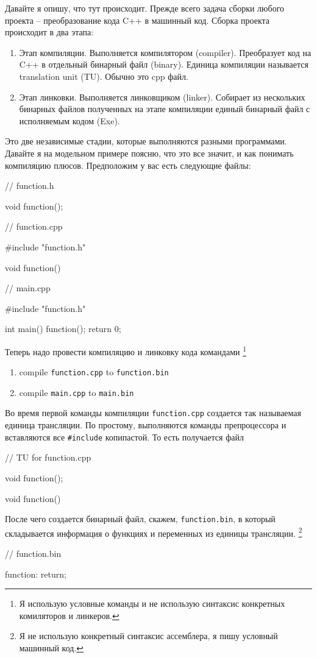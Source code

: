 Давайте я опишу, что тут происходит.
Прежде всего задача сборки любого проекта -- преобразование кода C++ в машинный код.
Сборка проекта происходит в два этапа:
\begin{enumerate}
\item Этап компиляции.
Выполняется компилятором (compiler).
Преобразует код на C++ в отдельный бинарный файл (binary).
Единица компиляции называется translation unit (TU).
Обычно это cpp файл.

\item Этап линковки.
Выполняется линковщиком (linker).
Собирает из нескольких бинарных файлов полученных на этапе компиляции единый бинарный файл с исполняемым кодом (Exe).
\end{enumerate}

Это две независимые стадии, которые выполняются разными программами.
Давайте я на модельном примере поясню, что это все значит, и как понимать компиляцию плюсов.
Предположим у вас есть следующие файлы:
\begin{cppcode}
// function.h

void function();

// function.cpp

#include "function.h"

void function() {
}

// main.cpp

#include "function.h"

int main() {
function();
return 0;
}
\end{cppcode}
Теперь надо провести компиляцию и линковку кода командами%
\footnote{Я использую условные команды и не использую синтаксис конкретных комиляторов и линкеров.}
\begin{enumerate}
\item compile \verb"function.cpp" to \verb"function.bin"

\item compile \verb"main.cpp" to \verb"main.bin"
\end{enumerate}
Во время первой команды компиляции \verb"function.cpp" создается так называемая единица трансляции.
По простому, выполняются команды препроцессора и вставляются все \verb"#include" копипастой.
То есть получается файл
\begin{cppcode}
// TU for function.cpp

void function();

void function() {
}
\end{cppcode}
После чего создается бинарный файл, скажем, \verb"function.bin", в который складывается информация о функциях и переменных из единицы трансляции.%
\footnote{Я не использую конкретный синтаксис ассемблера, я пишу условный машинный код.}
\begin{cppcode}
// function.bin

function:
  return;
\end{cppcode}

